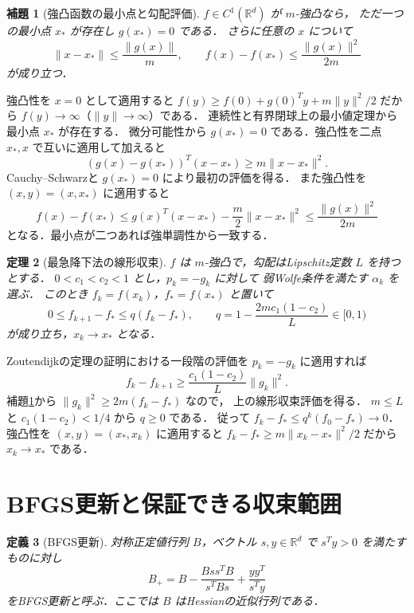 \documentclass[a5paper,10pt,onecolumn]{jsarticle}
\makeatletter
\theoremstyle{mathnotetheorem}
\newtheorem{theorem}{定理}[section]
\newtheorem{definition}[theorem]{定義}
\newtheorem{lemma}[theorem]{補題}
\renewcommand{\proofname}{証明}
\renewenvironment{proof}[1][\proofname]{%
  \par\pushQED{\qed}\normalfont\topsep4\p@\@plus2\p@\relax
  \trivlist\item[\hskip\labelsep\bfseries #1]\ignorespaces
}{\popQED\endtrivlist\@endpefalse}
\newcommand{\norm}[1]{\lVert #1\rVert}
\makeatother
\begin{document}
\begin{lemma}[強凸函数の最小点と勾配評価]\label{lem:strong}
$f\in C^1(\mathbb R^d)$ が $m$-強凸なら，
ただ一つの最小点 $x_*$ が存在し $g(x_*)=0$ である．
さらに任意の $x$ について
\[
 \norm{x-x_*}\le\frac{\norm{g(x)}}m,
 \qquad
 f(x)-f(x_*)\le\frac{\norm{g(x)}^2}{2m}
\]
が成り立つ．
\end{lemma}
\begin{proof}
強凸性を $x=0$ として適用すると
$f(y)\ge f(0)+g(0)^Ty+m\norm y^2/2$ だから
$f(y)\to\infty$（$\norm y\to\infty$）である．
連続性と有界閉球上の最小値定理から最小点 $x_*$ が存在する．
微分可能性から $g(x_*)=0$ である．強凸性を二点
$x_*,x$ で互いに適用して加えると
\[
 (g(x)-g(x_*))^T(x-x_*)\ge m\norm{x-x_*}^2.
\]
Cauchy--Schwarzと $g(x_*)=0$ により最初の評価を得る．
また強凸性を $(x,y)=(x,x_*)$ に適用すると
\[
 f(x)-f(x_*)\le g(x)^T(x-x_*)-
                  \frac m2\norm{x-x_*}^2
 \le\frac{\norm{g(x)}^2}{2m}
\]
となる．最小点が二つあれば強単調性から一致する．
\end{proof}

\begin{theorem}[最急降下法の線形収束]\label{thm:linear}
$f$ は $m$-強凸で，勾配はLipschitz定数 $L$ を持つとする．
$0<c_1<c_2<1$ とし，$p_k=-g_k$ に対して
弱Wolfe条件を満たす $\alpha_k$ を選ぶ．
このとき $f_k=f(x_k)$，$f_*=f(x_*)$ と置いて
\[
 0\le f_{k+1}-f_*\le q(f_k-f_*),
 \qquad q=1-\frac{2mc_1(1-c_2)}L\in[0,1)
\]
が成り立ち，$x_k\to x_*$ となる．
\end{theorem}
\begin{proof}
Zoutendijkの定理の証明における一段階の評価を
$p_k=-g_k$ に適用すれば
\[
 f_k-f_{k+1}\ge \frac{c_1(1-c_2)}L\norm{g_k}^2.
\]
補題\ref{lem:strong}から
$\norm{g_k}^2\ge2m(f_k-f_*)$ なので，
上の線形収束評価を得る．
$m\le L$ と $c_1(1-c_2)<1/4$ から $q\ge0$ である．
従って $f_k-f_*\le q^k(f_0-f_*)\to0$．
強凸性を $(x,y)=(x_*,x_k)$ に適用すると
$f_k-f_*\ge m\norm{x_k-x_*}^2/2$ だから $x_k\to x_*$ である．
\end{proof}

\section{BFGS更新と保証できる収束範囲}
\begin{definition}[BFGS更新]
対称正定値行列 $B$，ベクトル $s,y\in\mathbb R^d$ で
$s^Ty>0$ を満たすものに対し
\[
 B_+=B-\frac{Bss^TB}{s^TBs}+\frac{yy^T}{s^Ty}
\]
をBFGS更新と呼ぶ．ここでは $B$ はHessianの近似行列である．
\end{definition}
\end{document}
